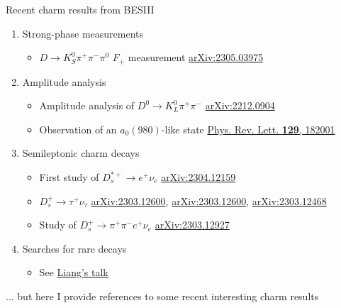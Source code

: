 \documentclass{beamer}
\begin{document}
\begin{frame}{Recent charm results from BESIII}
  \begin{enumerate}
    \item{Strong-phase measurements}
    \begin{itemize}
      \item{$D\to K_S^0\pi^+\pi^-\pi^0$ $F_+$ measurement \href{https://arxiv.org/abs/2305.03975}{arXiv:2305.03975}}
    \end{itemize}
    \item{Amplitude analysis}
    \begin{itemize}
      \item{Amplitude analysis of $D^0\to K_L^0\pi^+\pi^-$ \href{https://arxiv.org/abs/2212.09048}{arXiv:2212.0904}}
      \item{Observation of an $a_0(980)$-like state \href{https://journals.aps.org/prl/abstract/10.1103/PhysRevLett.129.182001}{Phys. Rev. Lett. \textbf{129}, 182001}}
    \end{itemize}
    \item{Semileptonic charm decays}
    \begin{itemize}
      \item{First study of $D_s^{*+}\to e^+\nu_e$ \href{https://arxiv.org/abs/2304.12159}{arXiv:2304.12159}}
      \item{$D_s^+\to\tau^+\nu_\tau$ \href{https://arxiv.org/abs/2303.12600}{arXiv:2303.12600}, \href{https://arxiv.org/abs/2303.12600}{arXiv:2303.12600}, \href{https://arxiv.org/abs/2303.12468}{arXiv:2303.12468}}
      \item{Study of $D_s^+\to\pi^+\pi^-e^+\nu_e$ \href{https://arxiv.org/abs/2303.12927}{arXiv:2303.12927}}
    \end{itemize}
    \item{Searches for rare decays}
    \begin{itemize}
      \item{See \href{https://indico.cern.ch/event/1166059/contributions/5305453/}{Liang's talk}}
    \end{itemize}
  \end{enumerate}
  \begin{center}
    {\Large ... but here I provide references to some recent interesting charm results}
  \end{center}
\end{frame}
\end{document}
